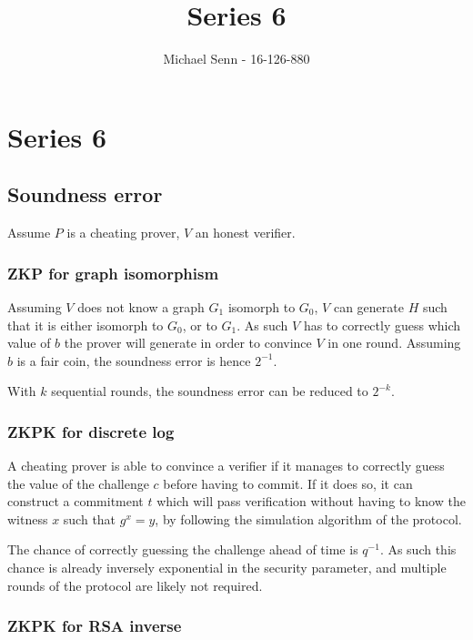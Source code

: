 \documentclass[a4paper]{scrreprt}
\title{Series 6}
\author{Michael Senn \maillink{michael.senn@students.unibe.ch} - 16-126-880}
\date{\printdate}
\begin{document}
\maketitle


\setcounter{chapter}{5}

\chapter{Series 6}

\section{Soundness error}

Assume $P$ is a cheating prover, $V$ an honest verifier.

\subsection{ZKP for graph isomorphism}

Assuming $V$ does not know a graph $G_1$ isomorph to $G_0$, $V$ can generate
$H$ such that it is either isomorph to $G_0$, or to $G_1$. As such $V$ has to
correctly guess which value of $b$ the prover will generate in order to
convince $V$ in one round. Assuming $b$ is a fair coin, the soundness error is
hence $2^{-1}$.

With $k$ sequential rounds, the soundness error can be reduced to $2^{-k}$.

\subsection{ZKPK for discrete log}

A cheating prover is able to convince a verifier if it manages to correctly
guess the value of the challenge $c$ before having to commit. If it does so, it
can construct a commitment $t$ which will pass verification without having to
know the witness $x$ such that $g^x = y$, by following the simulation algorithm
of the protocol.

The chance of correctly guessing the challenge ahead of time is $q^{-1}$. As
such this chance is already inversely exponential in the security parameter,
and multiple rounds of the protocol are likely not required.

\subsection{ZKPK for RSA inverse}
\end{document}
